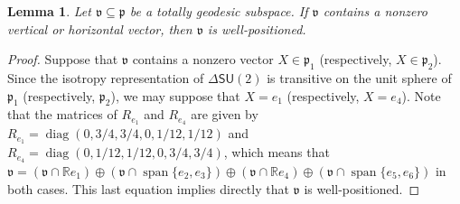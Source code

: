 \documentclass[11pt,a4paper,final]{amsart}
\newcommand{\g}{\mathfrak}
\newcommand{\R}{\mathbb{R}}
\newcommand{\vecspan}{\operatorname{span}}
\newtheorem{lemma}[theorem]{Lemma}
\theoremstyle{definition}
\begin{document}
\begin{lemma}\label{lemma:S3S3WellPositioned}
	Let $\g{v}\subseteq \g{p}$ be a totally geodesic subspace.
	If $\g{v}$ contains a nonzero vertical or horizontal vector, then $\g{v}$ is well-positioned.
\end{lemma}
\begin{proof}
	Suppose that $\g{v}$ contains a nonzero vector $X\in \g{p}_{1}$ (respectively, $X\in \g{p}_{2}$).
	Since the isotropy representation of $\Delta\mathsf{SU}(2)$ is transitive on the unit sphere of $\g{p}_{1}$ (respectively, $\g{p}_{2}$), we may suppose that $X=e_{1}$ (respectively, $X=e_{4}$).
	Note that the matrices of $R_{e_{1}}$ and $R_{e_{4}}$ are given by $R_{e_{1}}=\operatorname{diag}(0,3/4,3/4,0,1/12,1/12)$ and $R_{e_{4}}=\operatorname{diag}(0,1/12,1/12,0,3/4,3/4)$, which means that $\g{v}=(\g{v}\cap\R e_{1})\oplus (\g{v}\cap \vecspan\{e_{2},e_{3}\})\oplus (\g{v}\cap \R e_{4})\oplus (\g{v}\cap \vecspan\{e_{5},e_{6}\})$ in both cases.
	This last equation implies directly that $\g{v}$ is well-positioned. \qedhere
\end{proof}
	
\end{document}
